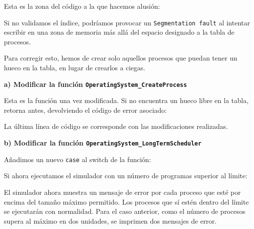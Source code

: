 \documentclass[12pt,a4paper]{article}
\begin{document}
\vspace{2mm} \noindent
Esta es la zona del código a la que hacemos alusión:

\indent
Si no validamos el índice, podríamos provocar un \texttt{Segmentation fault} al intentar escribir en una zona de memoria más allá del espacio designado a la tabla de procesos.

\vspace{2mm}
Para corregir esto, hemos de crear solo aquellos procesos que puedan tener un hueco en la tabla, en lugar de crearlos a ciegas.

\vspace{4ex} \noindent
\textbf{a) Modificar la función \texttt{OperatingSystem\_CreateProcess}}

\vspace{2mm}
Esta es la función una vez modificada. Si no encuentra un hueco libre en la tabla, retorna antes, devolviendo el código de error asociado:

La última línea de código se corresponde con las modificaciones realizadas.

\vspace{6ex}  \noindent
\textbf{b) Modificar la función \texttt{OperatingSystem\_LongTermScheduler}}

\vspace{2mm}
Añadimos un nuevo \texttt{case} al switch de la función:


\vspace{2mm} \noindent
Si ahora ejecutamos el simulador con un número de programas superior al límite:
\begin{terminal}
  
\end{terminal}
El simulador ahora muestra un mensaje de error por cada proceso que esté por encima del tamaño máximo permitido. Los procesos que sí estén dentro del límite se ejecutarán con normalidad. Para el caso anterior, como el número de procesos supera al máximo en dos unidades, se imprimen dos mensajes de error.
\end{document}

